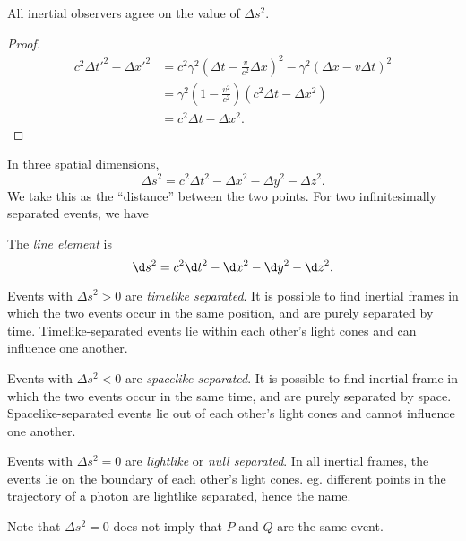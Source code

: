 \documentclass[a4paper]{article}
\begin{document}
\begin{prop}
  All inertial observers agree on the value of $\Delta s^2$.
\end{prop}

\begin{proof}
  \begin{align*}
    c^2 \Delta t'^2 - \Delta x'^2 &= c^2 \gamma^2 \left(\Delta t - \frac{v}{c^2}\Delta x\right)^2 - \gamma^2 (\Delta x - v\Delta t)^2\\
    &= \gamma^2 \left(1 - \frac{v^2}{c^2}\right)(c^2 \Delta t - \Delta x^2)\\
    &= c^2\Delta t - \Delta x^2.
  \end{align*}
\end{proof}

In three spatial dimensions,
\[
  \Delta s^2 = c^2\Delta t^2 - \Delta x^2 - \Delta y^2 - \Delta z^2.
\]
We take this as the ``distance'' between the two points. For two infinitesimally separated events, we have
\begin{defi}
  The \emph{line element} is
  \[
    \d s^2 = c^2 \d t^2 - \d x^2 - \d y^2 - \d z^2.
  \]
\end{defi}

\begin{defi}
  Events with $\Delta s^2 > 0$ are \emph{timelike separated}. It is possible to find inertial frames in which the two events occur in the same position, and are purely separated by time. Timelike-separated events lie within each other's light cones and can influence one another.

  Events with $\Delta s^2 < 0$ are \emph{spacelike separated}. It is possible to find inertial frame in which the two events occur in the same time, and are purely separated by space. Spacelike-separated events lie out of each other's light cones and cannot influence one another.

  Events with $\Delta s^2 = 0$ are \emph{lightlike} or \emph{null separated}. In all inertial frames, the events lie on the boundary of each other's light cones. eg. different points in the trajectory of a photon are lightlike separated, hence the name.
\end{defi}
Note that $\Delta s^2 = 0$ does not imply that $P$ and $Q$ are the same event.
\end{document}
